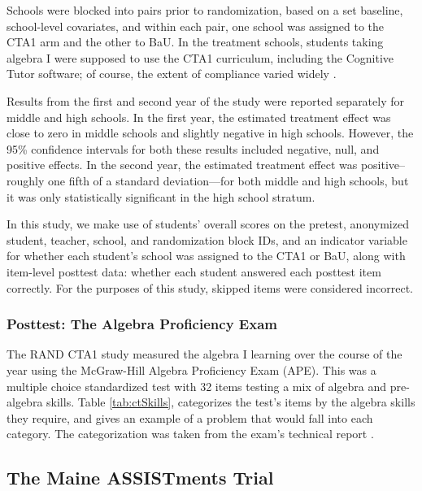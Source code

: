 \documentclass{edm_article}
\begin{document}
Schools were blocked into pairs prior to
randomization, based on a set baseline, school-level covariates, and
within each pair, one school was assigned to the CTA1 
arm and the other to BaU.
In the treatment schools, students taking algebra I were supposed to
use the CTA1 curriculum, including the Cognitive Tutor software; of
course, the extent of compliance varied widely
\cite{karam2017examining}\cite{descriptivePaper}. 

Results from the first and second year of the study were reported
separately for middle and high schools. In the first year, the
estimated treatment effect was close to zero in middle schools and
slightly negative in high schools. However, the 95\% confidence
intervals for both these results included negative, null, and positive
effects. In the second year, the estimated treatment effect was
positive--roughly one fifth of a standard deviation---for both middle
and high schools, but it was only statistically significant in the
high school stratum.

In this study, we make use of students' overall scores on the pretest,
anonymized student, teacher, school, and randomization block IDs, and
an indicator variable for whether each student's school was assigned
to the CTA1 or BaU, along with item-level posttest data: whether each
student answered each posttest item correctly.
For the purposes of this study, skipped items were considered
incorrect. 

\subsubsection{Posttest: The Algebra Proficiency Exam}
The RAND CTA1 study measured the algebra I learning over the course of
the year using the McGraw-Hill Algebra Proficiency Exam (APE). 
This was a multiple choice standardized test with 32 items testing
a mix of algebra and pre-algebra skills.
Table \ref{tab:ctSkills}, categorizes the test's items by the algebra
skills they require, and gives an example of a problem that would fall
into each category.
The categorization was taken from the exam's technical report
\cite{ctTechReport}.




\subsection{The Maine ASSISTments Trial}
\end{document}
